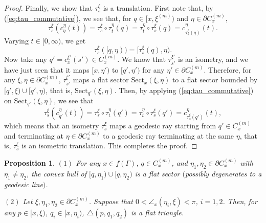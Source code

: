 \documentclass[12pt]{amsart}
\numberwithin{equation}{section}
\theoremstyle{plain}
\newtheorem{Proposition}[Theorem]{Proposition}
\theoremstyle{definition}
\theoremstyle{remark}
\newcommand{\xxi}[1]{\xi^{(#1)}}
\newcommand{\ray}[1]{[#1)}
\newcommand{\cc}[2]{c_{#1}^{#2}}
\newcommand{\tri}[3]{\triangle(#1,#2,#3)}
\newcommand{\trans}[2]{\tau_{#1}^{#2}}
\newcommand{\sect}[3][]{\mathrm{Sect}_{#1}(#2,#3)}
\newcommand{\cone}[2][]{C_{#1}^{(#2)}}
\begin{document}
\begin{proof}
 Finally, we show that $\trans{s}{\xi}$ is a translation. 
 First note that,  by (\ref{eq:tau_commutative}), we see that, for 
 $q \in \ray{x,\xxi{m}}$ and $\eta \in \partial \cone[x]{m}$, 
 \begin{equation*}
   \trans{s}{\xi}(\cc{q}{\eta}(t)) 
  = \trans{s}{\xi}\circ \trans{t}{\eta}(q)
  =\trans{t}{\eta}\circ \trans{s}{\xi}(q) 
  = c_{\trans{s}{\xi}(q)}^{\eta}(t). 
 \end{equation*}
 Varying $t \in \ray{0,\infty}$, we get 
 \begin{equation*}
  \trans{s}{\xi}(\ray{q,\eta}) = \ray{\trans{s}{\xi}(q),\eta}. 
 \end{equation*}
 Now take any $q'=\cc{x}{\xi'}(s') \in \cone[x]{m}$. 
 We know that $\trans{s'}{\xi'}$ is an isometry, and we have just seen
 that it maps $\ray{x,\eta'}$ to $\ray{q',\eta'}$ for any 
 $\eta' \in \partial \cone[x]{m}$.  
 Therefore, for any $\xi,\eta \in \partial \cone[x]{m}$, 
 $\trans{s'}{\xi'}$ maps a flat sector $\sect[x]{\xi}{\eta}$ to a flat
 sector bounded by $\ray{q',\xi}\cup \ray{q',\eta}$, that is, 
 $\sect[q']{\xi}{\eta}$. 
 Then, by applying (\ref{eq:tau_commutative}) on
 $\sect[q']{\xi}{\eta}$,  we see that
  \begin{equation*}
   \trans{s}{\xi}(\cc{q'}{\eta}(t)) =
    \trans{s}{\xi}\circ\trans{t}{\eta}(q')
    =\trans{t}{\eta}\circ \trans{s}{\xi}(q') 
    = \cc{\trans{s}{\xi}(q')}{\eta}(t), 
 \end{equation*}
 which means that an isometry $\trans{s}{\xi}$ maps a geodesic ray
 starting from $q' \in \cone[x]{m}$ and terminating at 
 $\eta \in \partial \cone[x]{m}$ to a geodesic ray terminating at 
 the same $\eta$, that is,  $\trans{s}{\xi}$ is an isometric
 translation.
 This completes the proof. 
\end{proof}

%
%
\begin{Proposition}
\label{prop:flat_triangle}
$(1)$ For any $x\in f(\Gamma)$, $q \in C_{x}^{(m)}$, and 
 $\eta_1,\eta_2 \in \partial\cone[x]{m}$ with $\eta_1\not=\eta_2$, 
 the convex hull of $[q,\eta_1)\cup [q,\eta_2)$ is a flat sector
 $($possibly degenerates to a geodesic line$)$. 

$(2)$ Let $\xi, \eta_1, \eta_2 \in \partial \cone[x]{m}$. 
 Suppose that $0<\angle_{x}(\eta_i,\xi)<\pi$, $i=1,2$. 
 Then, for any $p \in \ray{x,\xi}$, 
 $q_i \in \ray{x,\eta_i}$, $\tri{p}{q_1}{q_2}$ is a flat
 triangle. 
\end{Proposition}
\end{document}
